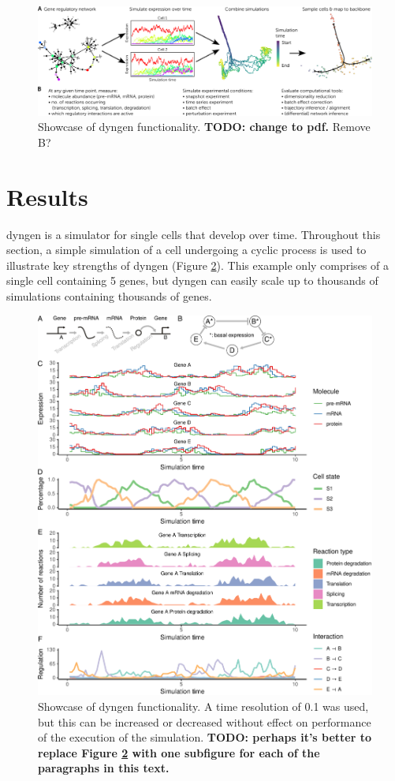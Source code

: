 \begin{figure}[hb]
	\centering
	\includegraphics[width=\linewidth]{fig/showcase_3.png} 
	\caption{Showcase of dyngen functionality. \textbf{TODO: change to pdf.} Remove B?} %
	\label{fig:dyngen}
\end{figure}

\section{Results}
dyngen is a simulator for single cells that develop over time. Throughout this section, a simple simulation of a cell undergoing a cyclic process is used to illustrate key strengths of dyngen (Figure \ref{fig:simplecyclic}). This example only comprises of a single cell containing 5 genes, but dyngen can easily scale up to thousands of simulations containing thousands of genes.

\begin{figure}[hb]
	\centering
	\includegraphics[width=\linewidth]{fig/simplecyclic_edited} 
	\caption{Showcase of dyngen functionality. A time resolution of 0.1 was used, but this can be increased or decreased without effect on performance of the execution of the simulation. \textbf{TODO: perhaps it's better to replace Figure \ref{fig:simplecyclic} with one subfigure for each of the paragraphs in this text.}}
	\label{fig:simplecyclic}
\end{figure}

